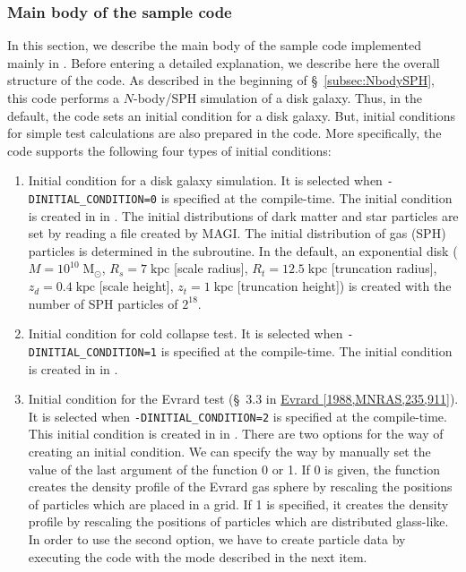 \subsubsection{Main body of the sample code}
\label{subsubsec:nbodysph_main_routine}
In this section, we describe the main body of the sample code implemented mainly in \fileNameOfMainFunc. Before entering a detailed explanation, we describe here the overall structure of the code. As described in the beginning of \S~\ref{subsec:NbodySPH}, this code performs a $N$-body/SPH simulation of a disk galaxy. Thus, in the default, the code sets an initial condition for a disk galaxy. But, initial conditions for simple test calculations are also prepared in the code. More specifically, the code supports the following four types of initial conditions:
\begin{enumerate}[leftmargin=*,itemsep=-1ex,label=(\alph*)]
\item Initial condition for a disk galaxy simulation. It is selected when \texttt{-DINITIAL\_CONDITION=0} is specified at the compile-time. The initial condition is created in \procedure {} in . The initial distributions of dark matter and star particles are set by reading a file created by \textsc{MAGI}. The initial distribution of gas (SPH) particles is determined in the subroutine. In the default, an exponential disk ($M=10^{10}\;\mathrm{M_{\odot}}$, $R_{s}=7\;\mathrm{kpc}$ [scale radius], $R_{t}=12.5\;\mathrm{kpc}$ [truncation radius], $z_{d}=0.4\;\mathrm{kpc}$ [scale height], $z_{t}=1\;\mathrm{kpc}$ [truncation height]) is created with the number of SPH particles of $2^{18}$.
\item Initial condition for cold collapse test. It is selected when \texttt{-DINITIAL\_CONDITION=1} is specified at the compile-time. The initial condition is created in \procedure {} in .
\item Initial condition for the Evrard test (\S~3.3 in \href{https://doi.org/10.1093/mnras/235.3.911}{Evrard [1988,MNRAS,235,911]}). It is selected when \texttt{-DINITIAL\_CONDITION=2} is specified at the compile-time. This initial condition is created in \procedure {} in . There are two options for the way of creating an initial condition. We can specify the way by manually set the value of the last argument of the function 0 or 1. If 0 is given, the function creates the density profile of the Evrard gas sphere by rescaling the positions of particles which are placed in a grid. If 1 is specified, it creates the density profile by rescaling the positions of particles which are distributed glass-like. In order to use the second option, we have to create particle data by executing the code with the mode described in the next item.

\end{enumerate}
